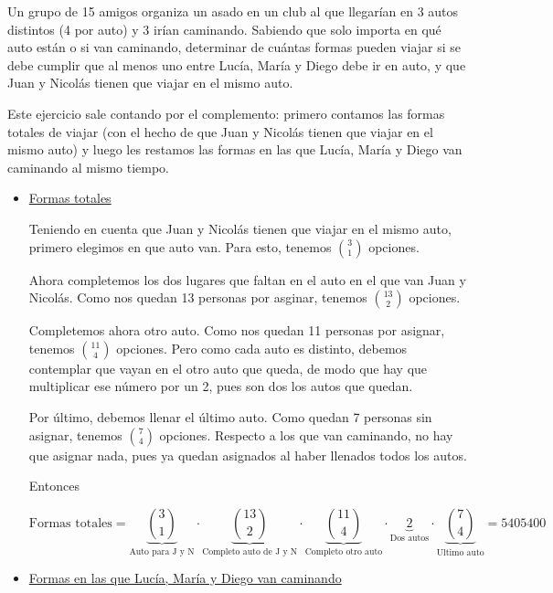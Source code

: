 \begin{enunciado}{\ejercicio}
    Un grupo de 15 amigos organiza un asado en un club al que llegarían en 3 autos distintos (4 por auto) 
    y 3 irían caminando. Sabiendo que solo importa en qué auto están o si van caminando, determinar de 
    cuántas formas pueden viajar si se debe cumplir que al menos uno entre Lucía, María y Diego debe 
    ir en auto, y que Juan y Nicolás tienen que viajar en el mismo auto.
\end{enunciado}

Este ejercicio sale contando por el complemento: primero contamos las formas totales de viajar (con el hecho de que Juan y Nicolás tienen
que viajar en el mismo auto) y luego les restamos las formas en las que Lucía, María y Diego van caminando al mismo tiempo.

\begin{itemize}

    \item \underline{Formas totales}

    Teniendo en cuenta que Juan y Nicolás tienen que viajar en el mismo auto, primero elegimos en que auto van. Para esto, 
    tenemos $\binom{3}{1}$ opciones. \bigskip

    Ahora completemos los dos lugares que faltan en el auto en el que van Juan y Nicolás. Como nos quedan 13 personas por asginar, 
    tenemos $\binom{13}{2}$ opciones. \bigskip

    Completemos ahora otro auto. Como nos quedan 11 personas por asignar, tenemos $\binom{11}{4}$ opciones. Pero como cada auto es distinto, 
    debemos contemplar que vayan en el otro auto que queda, de modo que hay que multiplicar ese número por un 2, 
    pues son dos los autos que quedan. \bigskip

    Por último, debemos llenar el último auto. Como quedan 7 personas sin asignar, tenemos $\binom{7}{4}$ opciones. Respecto a los que van caminando,
    no hay que asignar nada, pues ya quedan asignados al haber llenados todos los autos. \bigskip

    Entonces

    $$
    \text{Formas totales} = 
    \underbrace{\binom{3}{1}}_{\text{Auto para J y N}} \cdot
    \underbrace{\binom{13}{2}}_{\text{Completo auto de J y N}} \cdot
    \underbrace{\binom{11}{4}}_{\text{Completo otro auto}} \cdot
    \underbrace{2}_{\text{Dos autos}} \cdot
    \underbrace{\binom{7}{4}}_{\text{Ultimo auto}} 
    =5405400
    $$


    \item \underline{Formas en las que Lucía, María y Diego van caminando}


\end{itemize}
